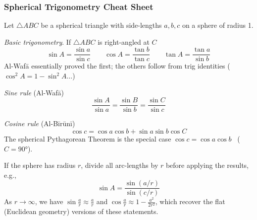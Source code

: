 \subsubsection*{Spherical Trigonometry Cheat Sheet}

Let $\triangle ABC$ be a spherical triangle with side-lengths $a,b,c$ on a sphere of radius 1.\medbreak

\emph{Basic trigonometry}. If $\triangle ABC$ is right-angled at $C$
\[
	\sin A=\frac{\sin a}{\sin c}\qquad \cos A=\frac{\tan b}{\tan c}\qquad \tan A=\frac{\tan a}{\sin b}
\]
Al-Wafā essentially proved the first; the others follow from trig identities ($\cos^2A=1-\sin^2A\ldots$)\medbreak

\emph{Sine rule} (Al-Wafā)
\[
	\frac{\sin A}{\sin a}=\frac{\sin B}{\sin b}=\frac{\sin C}{\sin c}
\]

\emph{Cosine rule} (Al-Bīrūnī)
\[
	\cos c=\cos a\cos b+\sin a\sin b\cos C
\]
The spherical Pythagorean Theorem is the special case $\cos c=\cos a\cos b$ \ ($C=\ang{90}$).\medbreak

If the sphere has radius $r$, divide all arc-lengths by $r$ before applying the results, e.g.,
\[
	\sin A=\frac{\sin (a/r)}{\sin(c/r)}
\]
As $r\to\infty$, we have $\sin\frac ar\approx \frac ar$ and $\cos\frac ar\approx 1-\frac{a^2}{2r^2}$, which recover the flat (Euclidean geometry) versions of these statements.

